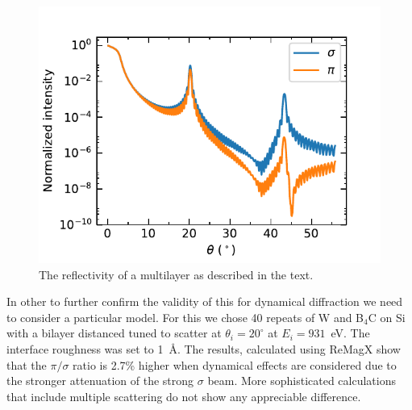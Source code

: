 \documentclass[aps,onecolumn, notitlepage, longbibliography]{revtex4-1}
\begin{document}

\begin{figure}
    \includegraphics{Figs/ReMagX.pdf}
    \caption{The reflectivity of a multilayer as described in the text.}
    \label{Cu_RIXS_spectra}
\end{figure}

In other to further confirm the validity of this for dynamical diffraction we need to consider a particular model. For this we chose 40 repeats of W and B$_4$C on Si with a bilayer distanced tuned to scatter at $\theta_i=20^{\circ}$ at $E_i=931$~eV. The interface roughness was set to 1~\AA{}. The results, calculated using ReMagX \cite{Macke2014} show that the $\pi/\sigma$ ratio is 2.7\% higher when dynamical effects are considered due to the stronger attenuation of the strong $\sigma$ beam.  More sophisticated calculations that include multiple scattering do not show any appreciable difference. 




\end{document}
